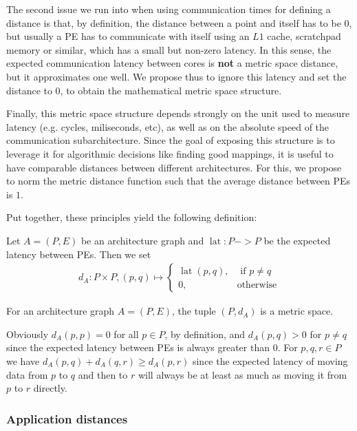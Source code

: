 The second issue we run into when using communication times for defining a distance is that, by definition, the distance between a point and itself has to be $0$, but usually a PE has to communicate with itself using an $L1$ cache, scratchpad memory or similar, which has a small but non-zero latency. In this sense, the expected communication latency between cores is \textbf{not} a metric space distance, but it approximates one well. We propose thus to ignore this latency and set the distance to 0, to obtain the mathematical metric space structure. 

Finally, this metric space structure depends strongly on the unit used to measure latency (e.g. cycles, miliseconds, etc), as well as on the absolute speed of the communication subarchitecture.
Since the goal of exposing this structure is to leverage it for algorithmic decisions like finding good mappings, it is useful to have comparable distances between different architectures.
For this, we propose to norm the metric distance function such that the average distance between PEs is $1$.

Put together, these principles yield the following definition:
\begin{defn}
Let $A = (P,E)$ be an architecture graph and $\operatorname{lat} : P -> P$ be the expected latency between PEs.
Then we set
\begin{align}
  d_A : P \times P, (p,q) \mapsto \left\{
      \begin{array}{rr}
        \operatorname{lat}(p,q), & \text{ if } p \neq q \\
        0, & \text{otherwise}
      \end{array} \right.
      \end{align}
\end{defn}
\begin{rem}
For an architecture graph $A = (P,E)$, the tuple $(P,d_A)$ is a metric space.
\begin{bew}
Obviously $d_A(p,p) = 0$ for all $p \in P$, by definition, and $d_A(p,q) > 0$ for $p \neq q$ since the expected latency between PEs is always greater than 0.
For $p,q,r \in P$ we have $d_A(p,q) + d_A(q,r) \geq d_A(p,r)$ since the expected latency of moving data from $p$ to $q$ and then to $r$ will always be at least as much as moving it from $p$ to $r$ directly.
\end{bew}
\end{rem}

\subsubsection{Application distances}

